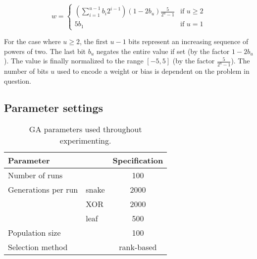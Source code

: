 \begin{equation*}\label{eq:weightdecoding}
  w =
  \begin{cases}
    \left(\sum_{i=1}^{u-1}b_i2^{i-1}\right)\left(1-2b_u\right)\frac{5}{2^u-1}  & \text{if } u \geq 2 \\
    5b_1                                                        & \text{if } u = 1
  \end{cases}
\end{equation*}

For the case where $u \geq 2$, the first $u-1$ bits represent an increasing sequence of powers of two. The last bit $b_u$ negates the entire value if set (by the factor $1-2b_u$). The value is finally normalized to the range $[-5, 5]$ (by the factor $\frac{5}{2^u-1}$).
The number of bits $u$ used to encode a weight or bias is dependent on the problem in question.





\subsection{Parameter settings}

\begin{table}
  \centering
  \begin{tabular}{l l S}
    \toprule
    Parameter & & {Specification} \\
    \midrule
    Number of runs & & 100 \\
    Generations per run & snake & 2000 \\
    & XOR & 2000 \\
    & leaf & 500 \\
    Population size & & 100 \\
    Selection method & & {rank-based} \\
    \bottomrule
  \end{tabular}
  \caption{GA parameters used throughout experimenting.}
  \label{tab:gaparam}
\end{table}

